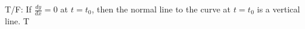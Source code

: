 {T/F: If $\frac{dy}{dx}=0$ at $t=t_0$, then the normal line to the curve at $t=t_0$ is a vertical line.}
{T}
